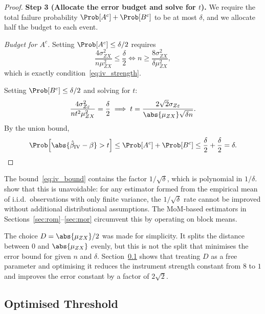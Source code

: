 \begin{proof}
    \medskip\noindent\textbf{Step 3 (Allocate the error budget and solve for $t$).}
    We require the total failure probability $\Prob[A^c]+\Prob[B^c]$ to be at most $\delta$, and we allocate half the budget to each event.

    \emph{Budget for $A^c$.}
    Setting $\Prob[A^c]\leq\delta/2$ requires
    \[
        \frac{4\sigma_{ZX}^2}{n\mu_{ZX}^2} \leq \frac{\delta}{2}
        \iff
        n \geq \frac{8\sigma_{ZX}^2}{\delta\mu_{ZX}^2},
    \]
    which is exactly condition~\eqref{eq:iv_strength}.

    Setting $\Prob[B^c]\leq\delta/2$ and solving for $t$:
    \[
        \frac{4\sigma_{Z\varepsilon}^2}{nt^2\mu_{ZX}^2} = \frac{\delta}{2} \implies t = \frac{2\sqrt{2}\sigma_{Z\varepsilon}}{\abs{\mu_{ZX}}\sqrt{\delta n}}.
    \]
    By the union bound,
    \[
        \Prob\!\left[\abs{\hat{\beta}_{\mathrm{IV}}-\beta} > t\right] \leq \Prob[A^c] + \Prob[B^c] \leq \frac{\delta}{2} + \frac{\delta}{2} = \delta. \qedhere
    \]
\end{proof}

\begin{remark}
\label{rem:iv_polynomial}
    The bound~\eqref{eq:iv_bound} contains the factor $1/\sqrt{\delta}$, which is polynomial in $1/\delta$. \citet{devroye2016sub} show that this is unavoidable: for any estimator formed from the empirical mean of i.i.d.\ observations with only finite variance, the $1/\sqrt{\delta}$ rate cannot be improved without additional distributional assumptions. The MoM-based estimators in Sections~\ref{sec:rom}--\ref{sec:mor} circumvent this by operating on block means.
\end{remark}

\begin{remark}
\label{rem:iv_D_choice}
    The choice $D = \abs{\mu_{ZX}}/2$ was made for simplicity. It splits the distance between $0$ and $\abs{\mu_{ZX}}$ evenly, but this is not the split that minimises the error bound for given $n$ and $\delta$. Section~\ref{sec:iv_optimised} shows that treating $D$ as a free parameter and optimising it reduces the instrument strength constant from $8$ to $1$ and improves the error constant by a factor
    of $2\sqrt{2}$.
\end{remark}


\subsection{Optimised Threshold}
\label{sec:iv_optimised}


